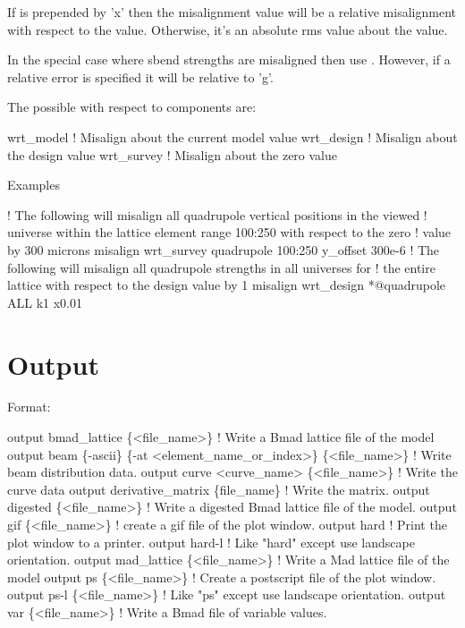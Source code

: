 If  is prepended by 'x' then the misalignment value will be
a relative misalignment with respect to the  value. Otherwise, it's an 
absolute rms value about the  value.

In the special case where sbend strengths are misaligned then use
. However, if a relative error is specified it will be 
relative to 'g'.

The possible with respect to components are:
\begin{example}
  wrt_model          ! Misalign about the current model value
  wrt_design         ! Misalign about the design value
  wrt_survey         ! Misalign about the zero value
\end{example}

Examples
\begin{example}
   ! The following will misalign all quadrupole vertical positions in the viewed
   ! universe within the lattice element range 100:250 with respect to the zero 
   ! value by 300 microns
  misalign wrt_survey quadrupole 100:250 y_offset 300e-6
   ! The following will misalign all quadrupole strengths in all universes for
   ! the entire lattice with respect to the design value by 1%
  misalign wrt_design *@quadrupole ALL k1 x0.01
\end{example}

\section{Output}
\label{s:output}

Format:
\begin{example}
  output bmad_lattice \{<file_name>\}       ! Write a Bmad lattice file of the model
  output beam \{-ascii\} \{-at <element_name_or_index>\} \{<file_name>\} 
                                          ! Write beam distribution data.
  output curve <curve_name> \{<file_name>\} ! Write the curve data
  output derivative_matrix \{file_name\}    ! Write the  matrix.
  output digested \{<file_name>\}     ! Write a digested Bmad lattice file of the model.
  output gif \{<file_name>\}          ! create a gif file of the plot window.
  output hard                       ! Print the plot window to a printer.
  output hard-l                     ! Like "hard" except use landscape orientation. 
  output mad_lattice \{<file_name>\}  ! Write a Mad lattice file of the model
  output ps \{<file_name>\}           ! Create a postscript file of the plot window.
  output ps-l \{<file_name>\}         ! Like "ps" except use landscape orientation.
  output var \{<file_name>\}          ! Write a Bmad file of variable values.
\end{example}

